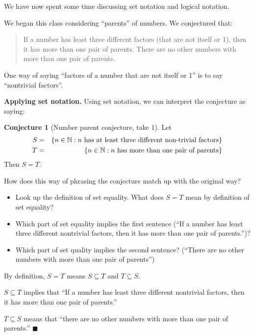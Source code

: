 \documentclass[11pt]{article}
\newenvironment{task}
	{\begin{mdframed}[linecolor=lightgray, linewidth=3pt]\raggedright}
	{\end{mdframed}}
\newcommand\tn{\textnormal}
\newcommand{\N}{\mathbb{N}}
\renewcommand\subset\subseteq
\newcommand\st{:}
\theoremstyle{definition}
\newtheorem{conjecture}[theorem]{Conjecture}
\newenvironment{solution}{{\it Solution.} }{\hfill {\color{lightgray}$\blacksquare$}}
\begin{document}
We have now spent some time discussing set notation and logical notation.

We began this class considering ``parents'' of numbers. We conjectured that:

\begin{quote}
If a number has least three different factors (that are not itself or 1), then it has more than one pair of parents. There are no other numbers with more than one pair of parents.
\end{quote}

One way of saying ``factors of a number that are not itself or 1'' is to say ``nontrivial factors''.

{\bf Applying set notation.} Using set notation, we can interpret the conjecture as saying:

\begin{conjecture}[Number parent conjecture, take 1]\label{c: number parent 1}
Let \begin{eqnarray*}
	S&=&\{ n\in \N\st n\tn{ has at least three different non-trivial factors}\} \\ 
	T&=&\{ n\in \N \st n \tn{ has more than one pair of parents}\} 
	\end{eqnarray*}
Then $S=T$.	
\end{conjecture}

\begin{task}
How does this way of phrasing the conjecture match up with the original way? 
	\begin{itemize}
	\item Look up the definition of set equality. What does $S=T$ mean by definition of set equality?
	\item Which part of set equality implies the first sentence (``If a number has least three different nontrivial factors, then it has more than one pair of parents.'')? 
	\item Which part of set quality implies the second sentence? (``There are no other numbers with more than one pair of parents'') 
	\end{itemize}
\end{task}

\begin{solution}
By definition, $S=T$ means $S\subset T$ and $T\subset S$.

$S\subset T$ implies that ``If a number has least three different nontrivial factors, then it has more than one pair of parents.''

$T\subset S$ means that ``there are no other numbers with more than one pair of parents.'' 
\end{solution}
\end{document}

